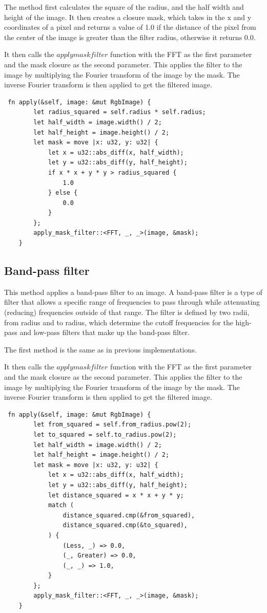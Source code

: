 \documentclass[12pt]{article}
\begin{document}
The method first calculates the square of the radius, and the half width and height of the image. It then creates a closure mask, which takes in the x and y coordinates of a pixel and returns a value of 1.0 if the distance of the pixel from the center of the image is greater than the filter radius, otherwise it returns 0.0.

It then calls the $apply mask filter$ function with the FFT as the first parameter and the mask closure as the second parameter. This applies the filter to the image by multiplying the Fourier transform of the image by the mask. The inverse Fourier transform is then applied to get the filtered image.
\begin{lstlisting}
 fn apply(&self, image: &mut RgbImage) {
        let radius_squared = self.radius * self.radius;
        let half_width = image.width() / 2;
        let half_height = image.height() / 2;
        let mask = move |x: u32, y: u32| {
            let x = u32::abs_diff(x, half_width);
            let y = u32::abs_diff(y, half_height);
            if x * x + y * y > radius_squared {
                1.0
            } else {
                0.0
            }
        };
        apply_mask_filter::<FFT, _, _>(image, &mask);
    }
\end{lstlisting}
\subsection{Band-pass filter}
This method applies a band-pass filter to an image. A band-pass filter is a type of filter that allows a specific range of frequencies to pass through while attenuating (reducing) frequencies outside of that range. The filter is defined by two radii, from radius and to radius, which determine the cutoff frequencies for the high-pass and low-pass filters that make up the band-pass filter.

The first method is the same as in previous implementations.

It then calls the $apply mask filter$ function with the FFT as the first parameter and the mask closure as the second parameter. This applies the filter to the image by multiplying the Fourier transform of the image by the mask. The inverse Fourier transform is then applied to get the filtered image.
\begin{lstlisting}
 fn apply(&self, image: &mut RgbImage) {
        let from_squared = self.from_radius.pow(2);
        let to_squared = self.to_radius.pow(2);
        let half_width = image.width() / 2;
        let half_height = image.height() / 2;
        let mask = move |x: u32, y: u32| {
            let x = u32::abs_diff(x, half_width);
            let y = u32::abs_diff(y, half_height);
            let distance_squared = x * x + y * y;
            match (
                distance_squared.cmp(&from_squared),
                distance_squared.cmp(&to_squared),
            ) {
                (Less, _) => 0.0,
                (_, Greater) => 0.0,
                (_, _) => 1.0,
            }
        };
        apply_mask_filter::<FFT, _, _>(image, &mask);
    }
\end{lstlisting}
\end{document}
